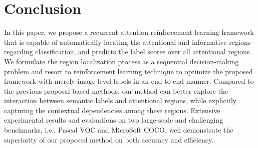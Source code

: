 \documentclass[letterpaper]{article} %
\begin{document}
\section{Conclusion}
In this paper, we propose a recurrent attention reinforcement learning framework that is capable of automatically locating the attentional and informative regions regarding classification, and predicts the label scores over all attentional regions. We formulate the region localization process as a sequential decision-making problem and resort to reinforcement learning technique to optimize the proposed framework with merely image-level labels in an end-to-end manner. Compared to the previous proposal-based methods, our method can better explore the interaction between semantic labels and attentional regions, while explicitly capturing the contextual dependencies among these regions. Extensive experimental results and evaluations on two large-scale and challenging benchmarks, i.e., Pascal VOC and MicroSoft COCO, well demonstrate the superiority of our proposed method on both accuracy and efficiency. 





\end{document}
